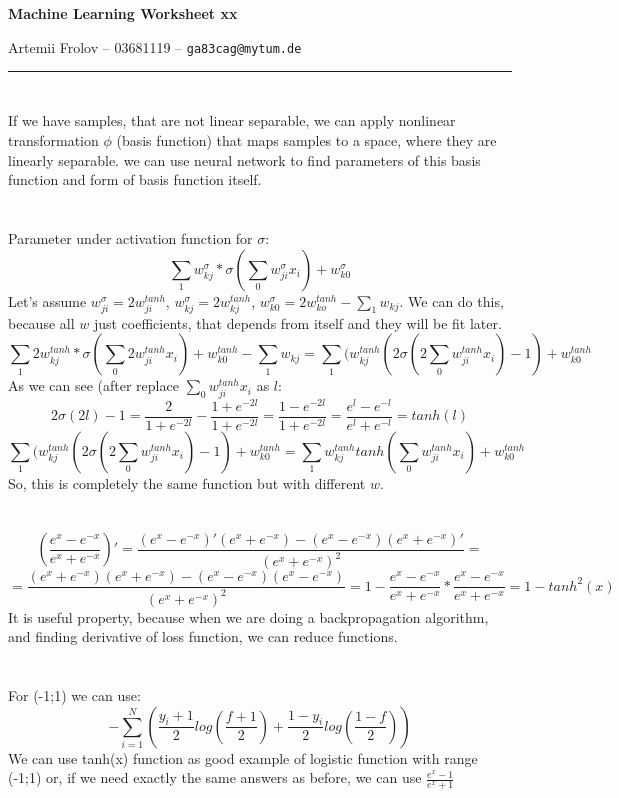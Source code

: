 \documentclass[11pt]{article}
\makeatletter
\newcommand{\exercise}{\section{}}
\newcommand{\hwhead}[4]{
\begin{center}
\sffamily\large\bfseries Machine Learning Worksheet #1
\vspace{2mm} 
\normalfont

#2 -- #3 -- \texttt{#4}
\end{center}
\vspace{6mm} \hrule \vspace{4mm}
}
\newcommand{\name}{Artemii Frolov} %
\newcommand{\imat}{03681119} %
\newcommand{\email}{ga83cag@mytum.de} %
\makeatother
\begin{document}
\hwhead{xx}{\name}{\imat}{\email}


\exercise %
If we have samples, that are not linear separable, we can apply nonlinear transformation $\phi$ (basis function) that maps samples to a space, where they are linearly separable.  we can use neural network to find parameters  of this basis function and form of basis function itself.

\exercise
Parameter under activation function for $\sigma$:
$$\sum_1 w^{\sigma}_{kj}*\sigma(\sum_0 w_{ji}^{\sigma}x_i)+w_{k0}^{\sigma}  $$
Let's assume $w_{ji}^{\sigma} =  2w_{ji}^{tanh}$, $w_{kj}^{\sigma} =  2 w_{kj}^{tanh}$, $w_{k0}^{\sigma} =  2 w_{ko}^{tanh} - \sum_1 w_{kj}$. We can do this, because all $w$ just coefficients, that depends from itself and they will be fit later.
$$\sum_1 2w^{tanh}_{kj}*\sigma(\sum_0 2w_{ji}^{tanh}x_i)+w_{k0}^{tanh}-\sum_1 w_{kj}=  \sum_1 (w^{tanh}_{kj}(2\sigma(2\sum_0 w_{ji}^{tanh}x_i)-1)+w_{k0}^{tanh}$$
As we can see (after replace $\sum_0 w_{ji}^{tanh}x_i$ as $l$:
$$2\sigma(2l)-1 = \frac{2}{1+e^{-2l}}-\frac{1+e^{-2l}}{1+e^{-2l}} =\frac{1-e^{-2l}}{1+e^{-2l}}= \frac{e^{l}-e^{-l}}{e^{l}+e^{-l}} = tanh(l)$$
$$\sum_1 (w^{tanh}_{kj}(2\sigma(2\sum_0 w_{ji}^{tanh}x_i)-1)+w_{k0}^{tanh}=\sum_1 w^{tanh}_{kj}tanh(\sum_0 w_{ji}^{tanh}x_i)+w_{k0}^{tanh}$$
So, this is completely the same function but with different $w$.
\exercise
$$(\frac{e^x-e^{-x}}{e^x+e^{-x}})'= \frac{(e^x-e^{-x})'(e^x+e^{-x})-(e^x-e^{-x})(e^x+e^{-x})'}{(e^x+e^{-x})^2}=$$
$$=\frac{(e^x+e^{-x})(e^x+e^{-x})-(e^x-e^{-x})(e^x-e^{-x})}{(e^x+e^{-x})^2} = 1- \frac{e^x-e^{-x}}{e^x+e^{-x}}*\frac{e^x-e^{-x}}{e^x+e^{-x}}=1-tanh^2(x)$$
It is useful property, because when we are doing a backpropagation algorithm, and finding derivative of loss function, we can reduce functions.

\exercise
For (-1;1) we can use:
$$-\sum_{i=1}^N(\frac{y_i+1}{2}log(\frac{f+1}{2})+\frac{1-y_i}{2}log(\frac{1-f}{2}))$$
We can use tanh(x) function as good example of logistic function with range (-1;1) or, if we need exactly the same answers as before, we can use $\frac{e^x-1}{e^x+1}$
\end{document}
